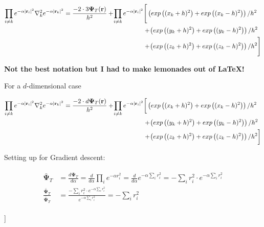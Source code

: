 \begin{@twocolumnfalse}
        \begin{align}
            \begin{split}
                \prod_{i \neq k} e^{-\alpha |\mathbf{r}_i|^2}\nabla^2_k e^{-\alpha |\mathbf{r}_k|^2} = \frac{- 2\cdot 3 \mathbf{\Psi}_T(\mathbf{r})}{h^2} + \! \prod_{i \neq k} e^{-\alpha |\mathbf{r}_i|^2} &\Bigg{[} \left(exp\left((x_k+h)^2\right) + exp\left((x_k-h)^2\right)\right)/h^2 \\
                & + \! \left(exp\left((y_k+h)^2\right) + exp\left((y_k-h)^2\right)\right)/h^2 \\
                & + \! \left(exp\left((z_k+h)^2\right) + exp\left((z_k-h)^2\right)\right)/h^2 \Bigg{]}
            \end{split}
        \end{align}
        
        \textbf{Not the best notation but I had to make lemonades out of \LaTeX! \\}
        
        For a $d$-dimensional case
        
        \begin{align}
            \begin{split}
                \prod_{i \neq k} e^{-\alpha |\mathbf{r}_i|^2}\nabla^2_k e^{-\alpha |\mathbf{r}_k|^2} = \frac{- 2\cdot d \mathbf{\Psi}_T(\mathbf{r})}{h^2} + \! \prod_{i \neq k} e^{-\alpha |\mathbf{r}_i|^2} &\bigg{[} \left(exp\left((x_k+h)^2\right) + exp\left((x_k-h)^2\right)\right)/h^2 \\
                & + \! \left(exp\left((y_k+h)^2\right) + exp\left((y_k-h)^2\right)\right)/h^2 \\
                & + \! \left(exp\left((z_k+h)^2\right) + exp\left((z_k-h)^2\right)\right)/h^2 \bigg{]}
            \end{split}
        \end{align}
        
        Setting up for Gradient descent:

        \begin{align}
            \begin{split}
                \bar{\mathbf{\Psi}}_T &= \frac{d\mathbf{\Psi}_T}{d\alpha} = \frac{d }{d\alpha} \prod_{i} e^{-\alpha r_i^2} = \frac{d }{d\alpha} e^{-\alpha\sum_i r_i^2} = -\sum_i r_i^2 \cdot e^{-\alpha \sum_i r_i^2}\\
                \frac{\bar{\mathbf{\Psi}}_T}{\bar{\mathbf{\Psi}}_T} &= \frac{-\sum_i r_i^2 \cdot e^{-\alpha \sum_i r_i^2}}{e^{-\alpha\sum_i r_i^2}} = -\sum_i r_i^2
            \end{split}
        \end{align}
    \end{@twocolumnfalse}
]

